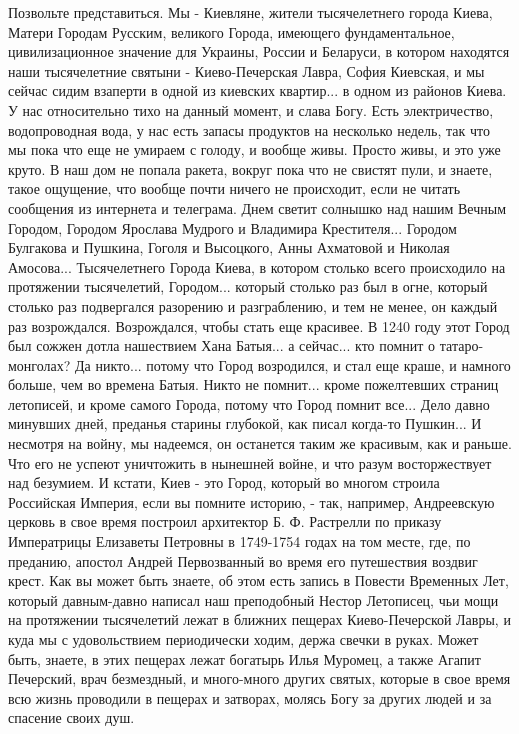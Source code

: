 Позвольте представиться. Мы - Киевляне, жители тысячелетнего города Киева,
Матери Городам Русским, великого Города, имеющего фундаментальное,
цивилизационное значение для Украины, России и Беларуси, в котором находятся
наши тысячелетние святыни - Киево-Печерская Лавра, София Киевская, и мы сейчас
сидим взаперти в одной из киевских квартир... в одном из районов Киева. У нас
относительно тихо на данный момент, и слава Богу. Есть электричество,
водопроводная вода, у нас есть запасы продуктов на несколько недель, так что мы
пока что еще не умираем с голоду, и вообще живы. Просто живы, и это уже круто.
В наш дом не попала ракета, вокруг пока что не свистят пули, и знаете, такое
ощущение, что вообще почти ничего не происходит, если не читать сообщения из
интернета и телеграма.  Днем светит солнышко над нашим Вечным Городом, Городом
Ярослава Мудрого и Владимира Крестителя... Городом Булгакова и Пушкина, Гоголя
и Высоцкого, Анны Ахматовой и Николая Амосова...  Тысячелетнего Города Киева, в
котором столько всего происходило на протяжении тысячелетий, Городом... который
столько раз был в огне, который столько раз подвергался разорению и
разграблению, и тем не менее, он каждый раз возрождался. Возрождался, чтобы
стать еще красивее. В 1240 году этот Город был сожжен дотла нашествием Хана
Батыя... а сейчас... кто помнит о татаро-монголах?  Да никто... потому что
Город возродился, и стал еще краше, и намного больше, чем во времена Батыя.
Никто не помнит... кроме пожелтевших страниц летописей, и кроме самого Города,
потому что Город помнит все... Дело давно минувших дней, преданья старины
глубокой, как писал когда-то Пушкин... И несмотря на войну, мы надеемся, он
останется таким же красивым, как и раньше.  Что его не успеют уничтожить в
нынешней войне, и что разум восторжествует над безумием.  И кстати, Киев - это
Город, который во многом строила Российская Империя, если вы помните историю, -
так, например, Андреевскую церковь в свое время построил архитектор Б. Ф.
Растрелли по приказу Императрицы Елизаветы Петровны в 1749-1754 годах на том
месте, где, по преданию, апостол Андрей Первозванный во время его путешествия
воздвиг крест. Как вы может быть знаете, об этом есть запись в Повести
Временных Лет, который давным-давно написал наш преподобный Нестор Летописец,
чьи мощи на протяжении тысячелетий лежат в ближних пещерах Киево-Печерской
Лавры, и куда мы с удовольствием периодически ходим, держа свечки в руках.
Может быть, знаете, в этих пещерах лежат богатырь Илья Муромец, а также Агапит
Печерский, врач безмездный, и много-много других святых, которые в свое время
всю жизнь проводили в пещерах и затворах, молясь Богу за других людей и за
спасение своих душ.

